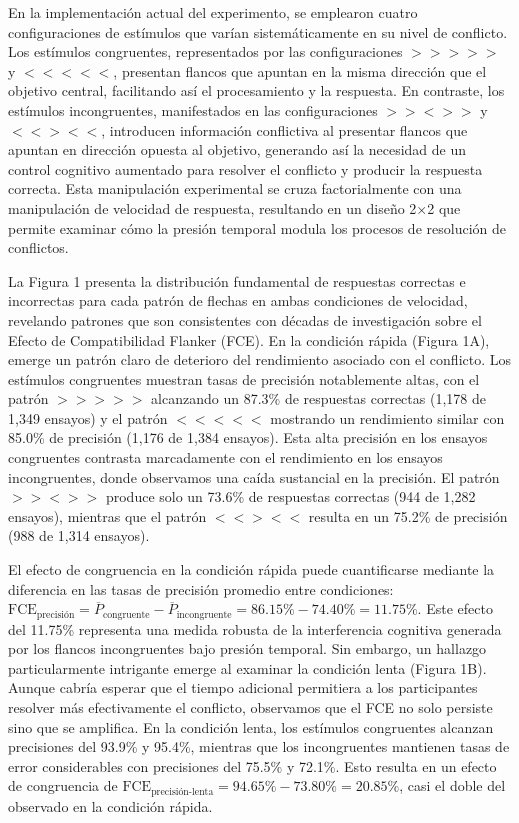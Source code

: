 \documentclass[
  spanish,
  10pt,
]{article}
\begin{document}
En la implementación actual del experimento, se emplearon cuatro
configuraciones de estímulos que varían sistemáticamente en su nivel de
conflicto. Los estímulos congruentes, representados por las
configuraciones \(>>>>>\) y \(<<<<<\), presentan flancos que apuntan en
la misma dirección que el objetivo central, facilitando así el
procesamiento y la respuesta. En contraste, los estímulos incongruentes,
manifestados en las configuraciones \(>><>>\) y \(<<><<\), introducen
información conflictiva al presentar flancos que apuntan en dirección
opuesta al objetivo, generando así la necesidad de un control cognitivo
aumentado para resolver el conflicto y producir la respuesta correcta.
Esta manipulación experimental se cruza factorialmente con una
manipulación de velocidad de respuesta, resultando en un diseño 2×2 que
permite examinar cómo la presión temporal modula los procesos de
resolución de conflictos.

La Figura 1 presenta la distribución fundamental de respuestas correctas
e incorrectas para cada patrón de flechas en ambas condiciones de
velocidad, revelando patrones que son consistentes con décadas de
investigación sobre el Efecto de Compatibilidad Flanker (FCE). En la
condición rápida (Figura 1A), emerge un patrón claro de deterioro del
rendimiento asociado con el conflicto. Los estímulos congruentes
muestran tasas de precisión notablemente altas, con el patrón \(>>>>>\)
alcanzando un 87.3\% de respuestas correctas (1,178 de 1,349 ensayos) y
el patrón \(<<<<<\) mostrando un rendimiento similar con 85.0\% de
precisión (1,176 de 1,384 ensayos). Esta alta precisión en los ensayos
congruentes contrasta marcadamente con el rendimiento en los ensayos
incongruentes, donde observamos una caída sustancial en la precisión. El
patrón \(>><>>\) produce solo un 73.6\% de respuestas correctas (944 de
1,282 ensayos), mientras que el patrón \(<<><<\) resulta en un 75.2\% de
precisión (988 de 1,314 ensayos).

El efecto de congruencia en la condición rápida puede cuantificarse
mediante la diferencia en las tasas de precisión promedio entre
condiciones:
\(\text{FCE}_{\text{precisión}} = \overline{P}_{\text{congruente}} - \overline{P}_{\text{incongruente}} = 86.15\% - 74.40\% = 11.75\%\).
Este efecto del 11.75\% representa una medida robusta de la
interferencia cognitiva generada por los flancos incongruentes bajo
presión temporal. Sin embargo, un hallazgo particularmente intrigante
emerge al examinar la condición lenta (Figura 1B). Aunque cabría esperar
que el tiempo adicional permitiera a los participantes resolver más
efectivamente el conflicto, observamos que el FCE no solo persiste sino
que se amplifica. En la condición lenta, los estímulos congruentes
alcanzan precisiones del 93.9\% y 95.4\%, mientras que los incongruentes
mantienen tasas de error considerables con precisiones del 75.5\% y
72.1\%. Esto resulta en un efecto de congruencia de
\(\text{FCE}_{\text{precisión-lenta}} = 94.65\% - 73.80\% = 20.85\%\),
casi el doble del observado en la condición rápida.
\end{document}
